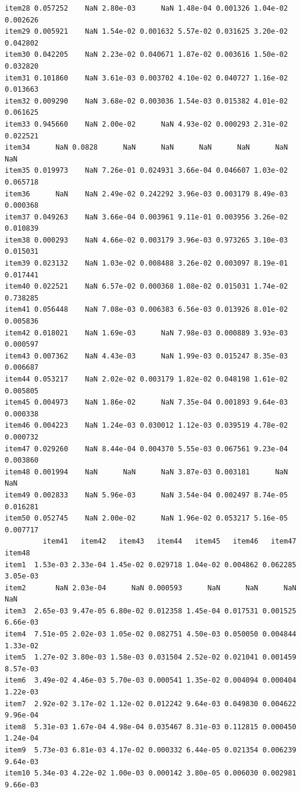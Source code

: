 \documentclass[
  a4paper,
]{ltjsbook}
\begin{document}
\begin{verbatim}
item28 0.057252    NaN 2.80e-03      NaN 1.48e-04 0.001326 1.04e-02 0.002626
item29 0.005921    NaN 1.54e-02 0.001632 5.57e-02 0.031625 3.20e-02 0.042802
item30 0.042205    NaN 2.23e-02 0.040671 1.87e-02 0.003616 1.50e-02 0.032820
item31 0.101860    NaN 3.61e-03 0.003702 4.10e-02 0.040727 1.16e-02 0.013663
item32 0.009290    NaN 3.68e-02 0.003036 1.54e-03 0.015382 4.01e-02 0.061625
item33 0.945660    NaN 2.00e-02      NaN 4.93e-02 0.000293 2.31e-02 0.022521
item34      NaN 0.0828      NaN      NaN      NaN      NaN      NaN      NaN
item35 0.019973    NaN 7.26e-01 0.024931 3.66e-04 0.046607 1.03e-02 0.065718
item36      NaN    NaN 2.49e-02 0.242292 3.96e-03 0.003179 8.49e-03 0.000368
item37 0.049263    NaN 3.66e-04 0.003961 9.11e-01 0.003956 3.26e-02 0.010839
item38 0.000293    NaN 4.66e-02 0.003179 3.96e-03 0.973265 3.10e-03 0.015031
item39 0.023132    NaN 1.03e-02 0.008488 3.26e-02 0.003097 8.19e-01 0.017441
item40 0.022521    NaN 6.57e-02 0.000368 1.08e-02 0.015031 1.74e-02 0.738285
item41 0.056448    NaN 7.08e-03 0.006383 6.56e-03 0.013926 8.01e-02 0.005836
item42 0.018021    NaN 1.69e-03      NaN 7.98e-03 0.000889 3.93e-03 0.000597
item43 0.007362    NaN 4.43e-03      NaN 1.99e-03 0.015247 8.35e-03 0.006687
item44 0.053217    NaN 2.02e-02 0.003179 1.82e-02 0.048198 1.61e-02 0.005805
item45 0.004973    NaN 1.86e-02      NaN 7.35e-04 0.001893 9.64e-03 0.000338
item46 0.004223    NaN 1.24e-03 0.030012 1.12e-03 0.039519 4.78e-02 0.000732
item47 0.029260    NaN 8.44e-04 0.004370 5.55e-03 0.067561 9.23e-04 0.003860
item48 0.001994    NaN      NaN      NaN 3.87e-03 0.003181      NaN      NaN
item49 0.002833    NaN 5.96e-03      NaN 3.54e-04 0.002497 8.74e-05 0.016281
item50 0.052745    NaN 2.00e-02      NaN 1.96e-02 0.053217 5.16e-05 0.007717
         item41   item42   item43   item44   item45   item46   item47   item48
item1  1.53e-03 2.33e-04 1.45e-02 0.029718 1.04e-02 0.004862 0.062285 3.05e-03
item2       NaN 2.03e-04      NaN 0.000593      NaN      NaN      NaN      NaN
item3  2.65e-03 9.47e-05 6.80e-02 0.012358 1.45e-04 0.017531 0.001525 6.66e-03
item4  7.51e-05 2.02e-03 1.05e-02 0.082751 4.50e-03 0.050050 0.004844 1.33e-02
item5  1.27e-02 3.80e-03 1.58e-03 0.031504 2.52e-02 0.021041 0.001459 8.57e-03
item6  3.49e-02 4.46e-03 5.70e-03 0.000541 1.35e-02 0.004094 0.000404 1.22e-03
item7  2.92e-02 3.17e-02 1.12e-02 0.012242 9.64e-03 0.049830 0.004622 9.96e-04
item8  5.31e-03 1.67e-04 4.98e-04 0.035467 8.31e-03 0.112815 0.000450 1.24e-04
item9  5.73e-03 6.81e-03 4.17e-02 0.000332 6.44e-05 0.021354 0.006239 9.64e-03
item10 5.34e-03 4.22e-02 1.00e-03 0.000142 3.80e-05 0.006030 0.002981 9.66e-03

\end{verbatim}
\end{document}
